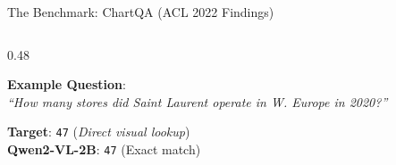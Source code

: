 \documentclass[aspectratio=169, 10pt]{beamer}
\begin{document}
\begin{frame}{The Benchmark: ChartQA (ACL 2022 Findings)}
\begin{columns}[T]
\begin{column}{0.48\textwidth}
\begin{tcolorbox}[colframe=secondary, title=\textbf{ChartQA-M (Machine Extractive)}]
                \textbf{Example Question}:\\
                \textit{``How many stores did Saint Laurent operate in W. Europe in 2020?''}
                \vspace{0.1cm}
                
                \textbf{Target}: \texttt{47} \quad (\textit{Direct visual lookup})\\
                \textbf{Qwen2-VL-2B}: \texttt{47} \quad \textcolor{success}{ (Exact match)}
            \end{tcolorbox}
        \end{column}
    \end{columns}
\end{frame}

\end{document}
